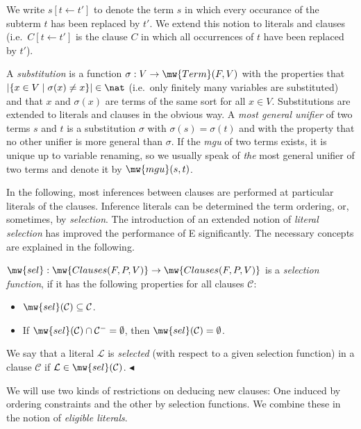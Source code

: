 \documentclass{report}
\begin{document}
We write $s[t\leftarrow t']$ to denote the term $s$ in which every
occurance of the subterm $t$ has been replaced by $t'$. We extend this
notion to literals and clauses (i.e.\ $C[t\leftarrow t']$ is the
clause $C$ in which all occurrences of $t$ have been replaced by
$t'$).

A \emph{substitution} is a function
$\sigma: V\to \mw{Term}(F,V)$ with the properties that
$|\{ x\in V \mid \sigma(x)\not=x\}| \in \nat$ (i.e.\ only finitely
many variables are substituted) and that $x$ and $\sigma(x)$ are terms
of the same sort for all $x \in V$. Substitutions are extended to
literals and clauses in the obvious way. A \emph{most general
  unifier} of two terms $s$ and
$t$ is a substitution $\sigma$ with $\sigma(s)=\sigma(t)$ and with the
property that no other unifier is more general than $\sigma$. If the
\emph{mgu} of two terms exists, it is unique up to variable renaming,
so we usually speak of \emph{the} most general unifier of two terms
and denote it by $\mw{mgu}(s,t)$.

In the following, most inferences between clauses are performed at
particular literals of the clauses. Inference literals can be
determined the term ordering, or, sometimes, by \emph{selection}.  The
introduction of an extended notion of \emph{literal selection} has
improved the performance of E significantly. The necessary concepts
are explained in the following.

\begin{definition}
  \label{def:basics:inferences:selection}
  $\mw{sel}:\mw{Clauses(F,P,V)} \rightarrow \mw{Clauses(F,P,V)}$ is a
  \emph{selection function}, if it has the following properties for
  all clauses $\mathcal{C}$:
    \begin{itemize}
    \item $\mw{sel}(\mathcal{C}) \subseteq \mathcal{C}$.
    \item If $\mw{sel}(\mathcal{C})\cap \mathcal{C^-} = \emptyset$, then
      $\mw{sel}(\mathcal{C}) = \emptyset$.
    \end{itemize}
    We say that a literal $\mathcal{L}$ is \emph{selected} (with
    respect to a given selection function) in a clause $\mathcal{C}$
    if $\mathcal{L} \in \mw{sel}(\mathcal{C})$.
  \hfill$\blacktriangleleft$
\end{definition}

We will use two kinds of restrictions on deducing new clauses: One
induced by ordering constraints and the other by selection functions.
We combine these in the notion of \emph{eligible literals}.
\end{document}
